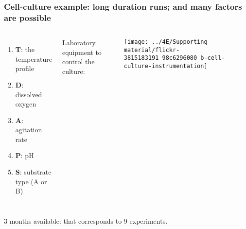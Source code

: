 \begin{frame}\frametitle{Cell-culture example: long duration runs; and many factors are possible}
	\begin{columns}[c]
			\begin{enumerate}
				\item	\textbf{T}: the temperature profile
				\item	\textbf{D}: dissolved oxygen
				\item	\textbf{A}: agitation rate
				\item	\textbf{P}: pH
				\item	\textbf{S}: substrate type (A or B)
			\end{enumerate}
		
			{\color{blue} \small Laboratory equipment to control the culture:} 
			
			\vspace{0.2cm}
			
			\centerline{\texttt{[image: ../4E/Supporting material/flickr-3815183191\_98c6296080\_b-cell-culture-instrumentation]}}
	\end{columns}

	\vfill
	3 months available: {\color{myOrange} that corresponds to 9 experiments}.
	
\end{frame}

